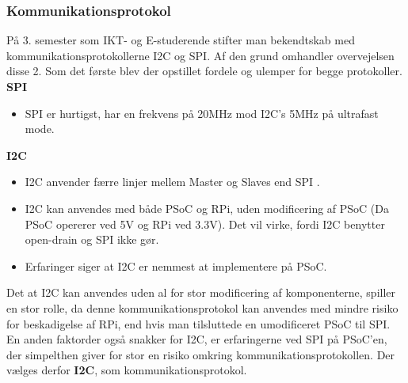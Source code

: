 \documentclass[a4paper,12pt,fleqn,oneside]{article}
\begin{document}
\subsubsection{Kommunikationsprotokol}
På 3. semester som IKT- og E-studerende stifter man bekendtskab med kommunikationsprotokollerne I2C\cite{i2c_protocol} og SPI\cite{spi_protocol}. Af den grund omhandler overvejelsen disse 2. Som det første blev der opstillet fordele og ulemper for begge protokoller.\\
\textbf{SPI}
\begin{itemize}
    \item SPI er hurtigst, har en frekvens på 20MHz mod I2C's 5MHz på ultrafast mode.
\end{itemize}
\textbf{I2C}
\begin{itemize}
    \item I2C anvender færre linjer mellem Master og Slaves end SPI .
    \item I2C kan anvendes med både PSoC og RPi, uden modificering af PSoC (Da PSoC opererer ved 5V og RPi ved 3.3V). Det vil virke, fordi  I2C benytter open-drain og SPI ikke gør.
    \item Erfaringer siger at I2C er nemmest at implementere på PSoC. 
\end{itemize}
Det at I2C kan anvendes uden al for stor modificering af komponenterne, spiller en stor rolle, da denne kommunikationsprotokol kan anvendes med mindre risiko for beskadigelse af RPi, end hvis man tilsluttede en umodificeret PSoC til SPI.\\
En anden faktorder også snakker for I2C, er erfaringerne ved SPI på PSoC'en, der simpelthen giver for stor en risiko omkring kommunikationsprotokollen. Der vælges derfor \textbf{I2C}, som kommunikationsprotokol.
\end{document}
